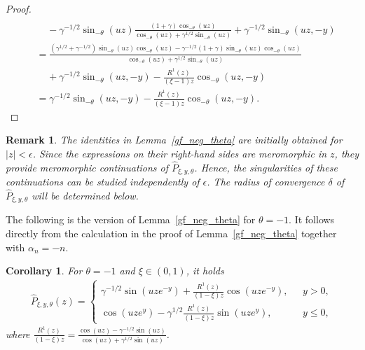 \documentclass[10pt,a4paper]{amsart}
\newcommand{\1}{\mathds{1}}
\newtheorem{Corollary}[definition]{Corollary}
\newtheorem{Remark}{Remark}
\begin{document}
\begin{proof}
\begin{align*}
     \\&~~~~~-\gamma^{-1/2}\sin_{-\theta}\left(uz\right)\frac{(1+\gamma)\cos_{-\theta}(uz)}{\cos_{-\theta}(uz)+\gamma^{1/2}\sin_{-\theta}(uz)}
     +\gamma^{-1/2}\sin_{-\theta}(uz,-y)
     \\&=\frac{(\gamma^{1/2}+\gamma^{-1/2})\sin_{-\theta}(uz)\cos_{-\theta}(uz)-\gamma^{-1/2}(1+\gamma)\sin_{-\theta}(uz)\cos_{-\theta}(uz)}{\cos_{-\theta}(uz)+\gamma^{1/2}\sin_{-\theta}(uz)}
     \\&~~~~~+\gamma^{-1/2}\sin_{-\theta}(uz,-y)-\frac{R^1(z)}{(\xi-1) z}\cos_{-\theta}(uz,-y)
     \\&=\gamma^{-1/2}\sin_{-\theta}(uz,-y)-\frac{R^1(z)}{(\xi-1) z}\cos_{-\theta}(uz,-y).\tag*{\qedhere}
\end{align*}
\end{proof}
\begin{Remark}
    The identities in Lemma~\ref{gf_neg_theta} are initially obtained
for $|z|<\epsilon$. Since the expressions on their right-hand
sides are meromorphic in $z$, they provide meromorphic
continuations of $\hat P_{\xi,y,\theta}$. Hence, the
singularities of these continuations can be studied independently
of $\epsilon$. The radius of convergence $\delta$ of
$\hat P_{\xi,y,\theta}$ will be determined below.
\end{Remark}
The following is the version of Lemma~\ref{gf_neg_theta} for $\theta=-1$. It follows directly from the calculation in the proof of Lemma~\ref{gf_neg_theta} together with $\alpha_n=-n$.
\begin{Corollary}\label{gf_theta-1}
    For $\theta=-1$ and $\xi\in(0,1)$, it holds
    \begin{align*}
      \hat{P}_{\xi,y,\theta}(z)=  
      \begin{cases}
          \gamma^{-1/2}\sin(uze^{-y})+\frac{R^1(z)}{(1-\xi) z}\cos(uze^{-y}),~~~&y>0,
          \\\cos(uze^y)
     -\gamma^{1/2}\frac{R^1(z)}{(1-\xi) z}\sin(uze^y),&y\le 0,
      \end{cases}
    \end{align*}
where $\frac{R^1(z)}{(1-\xi) z}=\frac{\cos(uz)-\gamma^{-1/2}\sin(uz)}{\cos(uz)+\gamma^{1/2}\sin(uz)}$.
\end{Corollary}
\end{document}
